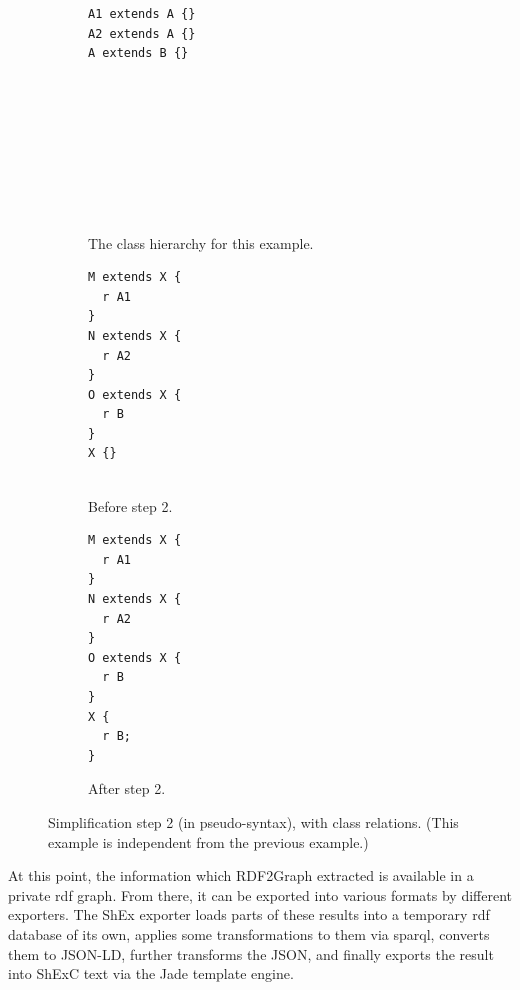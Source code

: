 \begin{figure}[ht]
  \begin{subfigure}[t]{0.3\textwidth}
    \begin{lstlisting}[showlines=true]
A1 extends A {}
A2 extends A {}
A extends B {}









    \end{lstlisting}
    \caption{The class hierarchy for this example.}
    \label{fig:simplify-7.4.2-classes-hierarchy}
  \end{subfigure}
  \begin{subfigure}[t]{0.3\textwidth}
    \begin{lstlisting}[showlines=true]
M extends X {
  r A1
}
N extends X {
  r A2
}
O extends X {
  r B
}
X {}


    \end{lstlisting}
    \caption{Before step 2.}
    \label{fig:simplify-7.4.2-classes-before}
  \end{subfigure}
  \begin{subfigure}[t]{0.3\textwidth}
    \begin{lstlisting}
M extends X {
  r A1
}
N extends X {
  r A2
}
O extends X {
  r B
}
X {
  r B;
}
    \end{lstlisting}
    \caption{After step 2.}
    \label{fig:simplify-7.4.2-classes-after}
  \end{subfigure}
  \caption[Simplification step 2, with class relations.]{
    Simplification step 2 (in pseudo-syntax), with class relations.
    (This example is independent from the previous example.)
  }
  \label{fig:simplify-7.4.2-classes}
\end{figure}

At this point, the information which RDF2Graph extracted is available in a private \gls{rdf} graph.
From there, it can be exported into various formats by different exporters.
The ShEx exporter loads parts of these results into a temporary \gls{rdf} database of its own,
applies some transformations to them via \gls{sparql},
converts them to JSON-LD,
further transforms the JSON,
and finally exports the result into ShExC text via the Jade template engine.

